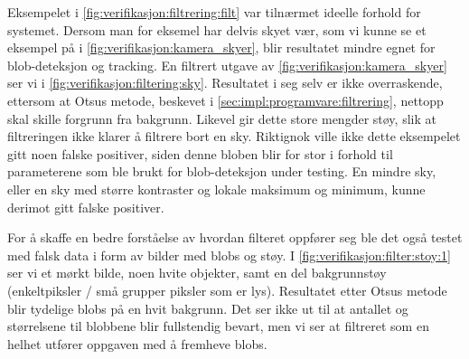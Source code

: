 Eksempelet i \autoref{fig:verifikasjon:filtrering:filt} var tilnærmet ideelle forhold for systemet.
Dersom man for eksemel har delvis skyet vær, som vi kunne se et eksempel på i \autoref{fig:verifikasjon:kamera_skyer}, blir resultatet mindre egnet for blob-deteksjon og tracking.
En filtrert utgave av \autoref{fig:verifikasjon:kamera_skyer} ser vi i \autoref{fig:verifikasjon:filtering:sky}.
Resultatet i seg selv er ikke overraskende, ettersom at Otsus metode, beskevet i \autoref{sec:impl:programvare:filtrering}, nettopp skal skille forgrunn fra bakgrunn.
Likevel gir dette store mengder støy, slik at filtreringen ikke klarer å filtrere bort en sky.
Riktignok ville ikke dette eksempelet gitt noen falske positiver, siden denne bloben blir for stor i forhold til parameterene som ble brukt for blob-deteksjon under testing. 
En mindre sky, eller en sky med større kontraster og lokale maksimum og minimum, kunne derimot gitt falske positiver.


For å skaffe en bedre forståelse av hvordan filteret oppfører seg ble det også testet med falsk data i form av bilder med blobs og støy.
I \autoref{fig:verifikasjon:filter:stoy:1} ser vi et mørkt bilde, noen hvite objekter, samt en del bakgrunnstøy (enkeltpiksler / små grupper piksler som er lys). 
Resultatet etter Otsus metode blir tydelige blobs på en hvit bakgrunn. 
Det ser ikke ut til at antallet og størrelsene til blobbene blir fullstendig bevart, men vi ser at filtreret som en helhet utfører oppgaven med å fremheve blobs.

